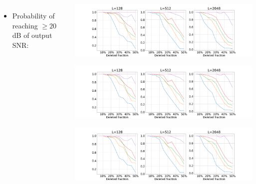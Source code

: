 \documentclass[25pt,a0paper]{tikzposter}
\begin{document}
\begin{columns}
{\begin{itemize}
    \item Probability of reaching $\ge 20$ dB of output SNR:
\end{itemize}
\begin{center}
\begin{minipage}{.25\linewidth}
\centering
\begin{tikzfigure}[]
  \includegraphics[width=\linewidth, trim={18.63cm 0 123.15cm 0},clip]{figures/probaCVSNR.png}
\end{tikzfigure}
\end{minipage}
\hspace{2cm}
\begin{minipage}{.25\linewidth}
\centering
\begin{tikzfigure}[]
  \includegraphics[width=\linewidth, trim={70.70cm 0 71.05cm 0},clip]{figures/probaCVSNR.png}
\end{tikzfigure}
\end{minipage}
\hspace{2cm}
\begin{minipage}{.25\linewidth}
\centering
\begin{tikzfigure}[]
  \includegraphics[width=\linewidth, trim={122.84cm 0 18.98cm 0},clip]{figures/probaCVSNR.png}
\end{tikzfigure}
\end{minipage}
\end{center}


}
\end{columns}
\end{document}
